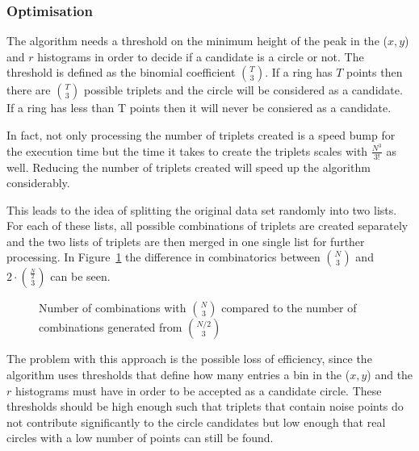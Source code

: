 \documentclass[11pt]{scrreprt}
\begin{document}
\subsubsection{Optimisation} %
\label{ssub:improvement_of_speed}

The algorithm needs a threshold on the minimum height of the peak in the ($x,y$) and $r$ histograms in order to decide if a candidate is a circle or not. The threshold is defined as the binomial coefficient $\binom{T}{3}$. If a ring has $T$ points then there are $\binom{T}{3}$ possible triplets and the circle will be considered as a candidate. If a ring has less than T points then it will never be consiered as a candidate. 

In fact, not only processing the number of triplets created is a speed bump for the execution time but the time it takes to create the triplets scales with $\frac{N^3}{3!}$ as well. Reducing the number of triplets created will speed up the algorithm considerably.

This leads to the idea of splitting the original data set randomly into two lists. For each of these lists, all possible combinations 
of triplets are  created separately and the two lists of triplets are then merged in one single list for further processing. In Figure~\ref{fig:binom_half_growth} 
the difference in combinatorics between $\binom{N}{3}$ and $2\cdot\binom{\frac{N}{2}}{3}$ can be seen.

\begin{figure}[b]
\centering
  \caption{Number of combinations with $\binom{N}{3}$ compared to the number of combinations generated from $\binom{N/2}{3}$}
  \label{fig:binom_half_growth}
\end{figure}

The problem with this approach is the possible loss of efficiency, since the
algorithm uses thresholds that define how many entries a bin in the ($x,y$) and the $r$ histograms must 
have in order to be accepted as a candidate circle.
These thresholds should be high enough such that triplets that contain noise points do not contribute significantly to the circle candidates but low enough that real circles with a
low number of points can still be found.
\end{document}
